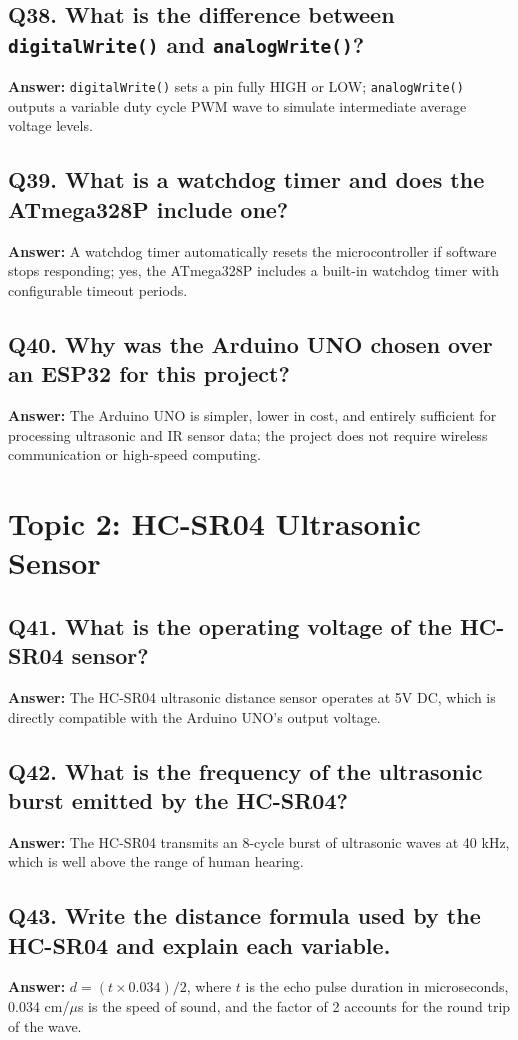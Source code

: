 \documentclass[12pt,a4paper,oneside]{report}
\begin{document}
\section{Q38. What is the difference between \texttt{digitalWrite()} and \texttt{analogWrite()}?}
\textbf{Answer:} \texttt{digitalWrite()} sets a pin fully HIGH or LOW; \texttt{analogWrite()} outputs a variable duty cycle PWM wave to simulate intermediate average voltage levels.

\section{Q39. What is a watchdog timer and does the ATmega328P include one?}
\textbf{Answer:} A watchdog timer automatically resets the microcontroller if software stops responding; yes, the ATmega328P includes a built-in watchdog timer with configurable timeout periods.

\section{Q40. Why was the Arduino UNO chosen over an ESP32 for this project?}
\textbf{Answer:} The Arduino UNO is simpler, lower in cost, and entirely sufficient for processing ultrasonic and IR sensor data; the project does not require wireless communication or high-speed computing.

\chapter{Topic 2: HC-SR04 Ultrasonic Sensor}

\section{Q41. What is the operating voltage of the HC-SR04 sensor?}
\textbf{Answer:} The HC-SR04 ultrasonic distance sensor operates at 5V DC, which is directly compatible with the Arduino UNO's output voltage.

\section{Q42. What is the frequency of the ultrasonic burst emitted by the HC-SR04?}
\textbf{Answer:} The HC-SR04 transmits an 8-cycle burst of ultrasonic waves at 40 kHz, which is well above the range of human hearing.

\section{Q43. Write the distance formula used by the HC-SR04 and explain each variable.}
\textbf{Answer:} $d = (t \times 0.034) / 2$, where $t$ is the echo pulse duration in microseconds, 0.034 cm/$\mu$s is the speed of sound, and the factor of 2 accounts for the round trip of the wave.
\end{document}
